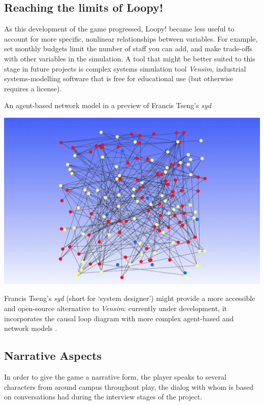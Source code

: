 \documentclass[nofonts,nols,justified,nobib]{tufte-book}
\begin{document}
\subsection*{Reaching the limits of Loopy!}

As this development of the game progressed, Loopy! became less useful to account for more specific, nonlinear relationships between variables. For example, set monthly budgets limit the number of staff you can add, and make trade-offs with other variables in the simulation. A tool that might be better suited to this stage in future projects is complex systems simulation tool \emph{Vensim}, industrial systems-modelling software that is free for educational use (but otherwise requires a license). 

\begin{marginfigure}
  \caption{An agent-based network model in a preview of Francis Tseng's \emph{syd} \cite{tseng_big_2016}}
  \includegraphics[width=1\linewidth]{img/3/syd.png}
  \label{contamination}
\end{marginfigure}

Francis Tseng's \emph{syd} (short for `system designer') might provide a more accessible and open-source alternative to \emph{Vensim}: currently under development, it incorporates the causal loop diagram with more complex agent-based and network models \cite{tseng_big_2016}. 

\subsection*{Narrative Aspects}

In order to give the game a narrative form, the player speaks to several characters from around campus throughout play, the dialog with whom is based on conversations had during the interview stages of the project.
\end{document}
